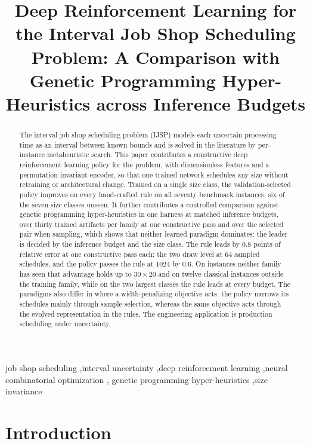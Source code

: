 \documentclass[preprint,12pt]{elsarticle}
\theoremstyle{definition}
\theoremstyle{remark}
\begin{document}
\begin{frontmatter}

\title{Deep Reinforcement Learning for the Interval Job Shop
Scheduling Problem: A Comparison with Genetic Programming
Hyper-Heuristics across Inference Budgets}


\begin{abstract}
The interval job shop scheduling problem (IJSP) models each uncertain
processing time as an interval between known bounds and is solved in
the literature by per-instance metaheuristic search. This paper
contributes a constructive deep reinforcement learning policy for the
problem, with dimensionless features and a permutation-invariant
encoder, so that one trained network schedules any size
without retraining or architectural change. Trained on a single
size class, the validation-selected policy improves on every
hand-crafted rule on all seventy benchmark instances, six
of the seven size classes unseen. It further contributes a
controlled comparison against genetic programming hyper-heuristics in
one harness at matched inference budgets, over thirty trained
artifacts per family at one constructive pass and over the selected
pair when sampling, which shows that neither learned
paradigm dominates: the leader is decided by the inference budget and
the size class. The rule leads by $0.8$ points of relative error at one
constructive pass each; the two draw level at $64$ sampled schedules,
and the policy passes the rule at $1024$ by $0.6$. On instances
neither family has seen that advantage holds up to $30{\times}20$ and
on twelve classical instances outside the training family, while on
the two largest classes the rule leads at every budget. The paradigms
also differ in where a width-penalizing objective acts: the policy
narrows its schedules mainly through sample selection, whereas the
same objective acts through the evolved representation in the rules. The engineering application is
production scheduling under uncertainty.
\end{abstract}

\begin{keyword}
job shop scheduling \sep interval uncertainty \sep deep
reinforcement learning \sep neural combinatorial optimization \sep
genetic programming hyper-heuristics \sep size invariance
\end{keyword}

\end{frontmatter}

\section{Introduction}
\label{sec:intro}
\end{document}
